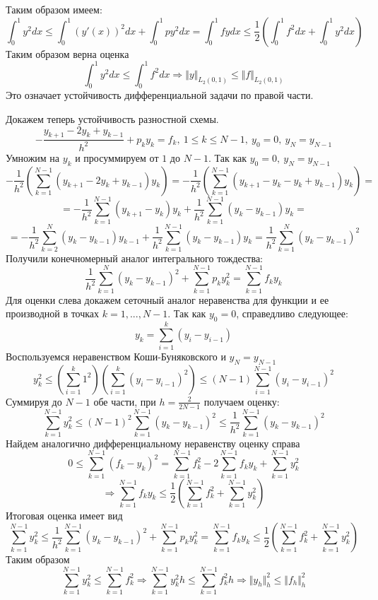 \documentclass[12pt]{article}
\begin{document}
\begin{enumerate}[I.]
	      Таким образом имеем:
	      \[\int_0^1y^2dx\leq\int_0^1 (y'(x))^2dx+ \int_0^1py^2 dx = \int_0^1fydx\leq\frac{1}{2}\left(\int_0^1f^2dx + \int_0^1y^2dx\right)\]
	      Таким образом верна оценка
	      \[\int_0^1y^2dx\leq\int_0^1f^2dx\Rightarrow\Vert y\Vert_{L_2(0,1)}\leq\Vert f\Vert_{L_2(0,1)}\]
	      Это означает устойчивость дифференциальной задачи по правой части.

	      Докажем теперь устойчивость разностной схемы.
	      \[-\frac{y_{k+1}-2y_k+y_{k-1}}{h^2}+p_ky_k = f_k,\ 1 \leq k \leq N-1,\ y_0 = 0,\ y_N = y_{N-1}\]
	      Умножим на $y_k$ и просуммируем от $1$ до $N-1$. Так как $y_0 = 0,\ y_N = y_{N-1}$
	      \[-\frac{1}{h^2}\left(\sum_{k=1}^{N-1}\left(y_{k+1}-2y_k+y_{k-1}\right)y_k\right)=-\frac{1}{h^2}\left(\sum_{k=1}^{N-1}\left(y_{k+1}-y_k-y_k+y_{k-1}\right)y_k\right)=\]
	      \[=-\frac{1}{h^2}\sum_{k=1}^{N-1}\left(y_{k+1}-y_k\right)y_k+\frac{1}{h^2}\sum_{k=1}^{N-1}\left(y_k-y_{k-1}\right)y_k=\]
	      \[=-\frac{1}{h^2}\sum_{k=2}^{N}\left(y_{k}-y_{k-1}\right)y_{k-1}+\frac{1}{h^2}\sum_{k=1}^{N-1}\left(y_k-y_{k-1}\right)y_k=\frac{1}{h^2}\sum_{k=1}^{N}(y_k-y_{k-1})^2\]
	      Получили конечномерный аналог интегрального тождества:
	      \[\frac{1}{h^2}\sum_{k=1}^N(y_k-y_{k-1})^2+\sum_{k=1}^{N-1}p_ky_k^2=\sum_{k=1}^{N-1}f_ky_k\]
	      Для оценки слева докажем сеточный аналог неравенства для функции и ее производной в точках $k=1,...,N-1$.
	      Так как $y_0 = 0$, справедливо следующее:
	      \[y_k=\sum_{i=1}^{k}(y_i-y_{i-1})\]
	      Воспользуемся неравенством Коши-Буняковского и $y_N=y_{N-1}$
	      \[y_k^2\leq\left(\sum_{i=1}^k1^2\right)\left(\sum_{i=1}^k(y_i-y_{i-1})^2\right)\leq (N-1)\sum_{i=1}^{N-1}(y_i-y_{i-1})^2\]
	      Суммируя до $N-1$ обе части, при $h=\frac{2}{2N-1}$ получаем оценку:
	      \[\sum_{k=1}^{N-1}y_k^2\leq(N-1)^2\sum_{k=1}^{N-1}(y_k-y_{k-1})^2\leq\frac{1}{h^2}\sum_{k=1}^{N-1}(y_k-y_{k-1})^2\]
	      Найдем аналогично дифференциальному неравенству оценку справа
	      \[0\leq\sum_{k=1}^{N-1}(f_k-y_k)^2 = \sum_{k=1}^{N-1}f_k^2-2\sum_{k=1}^{N-1}f_ky_k+\sum_{k=1}^{N-1}y_k^2\]
	      \[\Rightarrow\sum_{k=1}^{N-1}f_ky_k\leq\frac{1}{2}\left(\sum_{k=1}^{N-1}f_k^2+\sum_{k=1}^{N-1}y_k^2\right)\]
	      Итоговая оценка имеет вид
	      \[\sum_{k=1}^{N-1}y_k^2\leq\frac{1}{h^2}\sum_{k=1}^{N-1}(y_k-y_{k-1})^2+\sum_{k=1}^{N-1}p_ky_k^2=\sum_{k=1}^{N-1}f_ky_k\leq\frac{1}{2}\left(\sum_{k=1}^{N-1}f_k^2+\sum_{k=1}^{N-1}y_k^2\right)\]
	      Таким образом
	      \[\sum_{k=1}^{N-1}y_k^2\leq\sum_{k=1}^{N-1}f_k^2\Rightarrow\sum_{k=1}^{N-1}y_k^2h\leq\sum_{k=1}^{N-1}f_k^2h\Rightarrow\Vert y_h\Vert^2_h\leq\Vert f_h\Vert^2_h\]

\end{enumerate}
\end{document}
